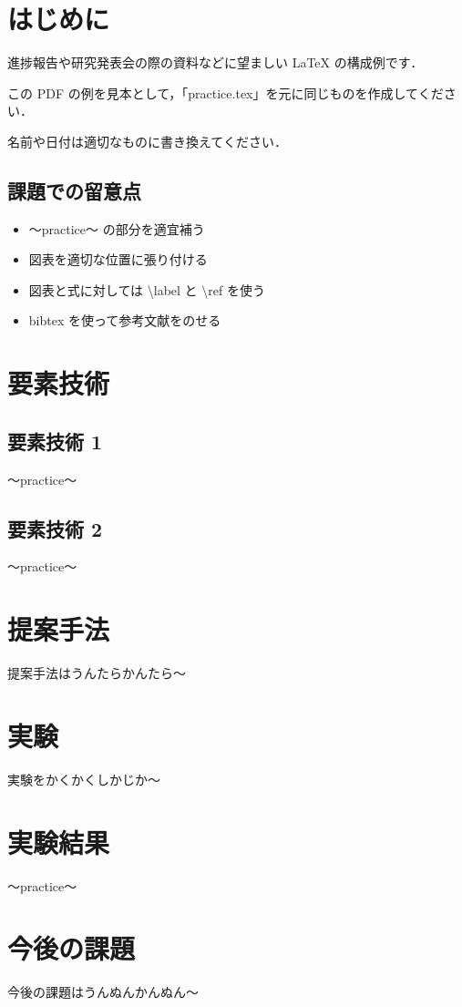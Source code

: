\documentclass[twocolumn]{jarticle}     %
\begin{document}

\section{はじめに}
進捗報告や研究発表会の際の資料などに望ましい LaTeX の構成例です．\par
この PDF の例を見本として，「practice.tex」を元に同じものを作成してください．\par
名前や日付は適切なものに書き換えてください．

\subsection{課題での留意点}

\begin{itemize}
\item 〜practice〜 の部分を適宜補う
\item 図表を適切な位置に張り付ける
\item 図表と式に対しては \textbackslash label と \textbackslash ref を使う
\item bibtex を使って参考文献をのせる
\end{itemize}

\section{要素技術}

\subsection{要素技術 1}
〜practice〜 

\subsection{要素技術 2}
〜practice〜 

\section{提案手法}
提案手法はうんたらかんたら〜

\section{実験}
実験をかくかくしかじか〜

\section{実験結果}
〜practice〜 

\section{今後の課題}
今後の課題はうんぬんかんぬん〜


\end{document}
